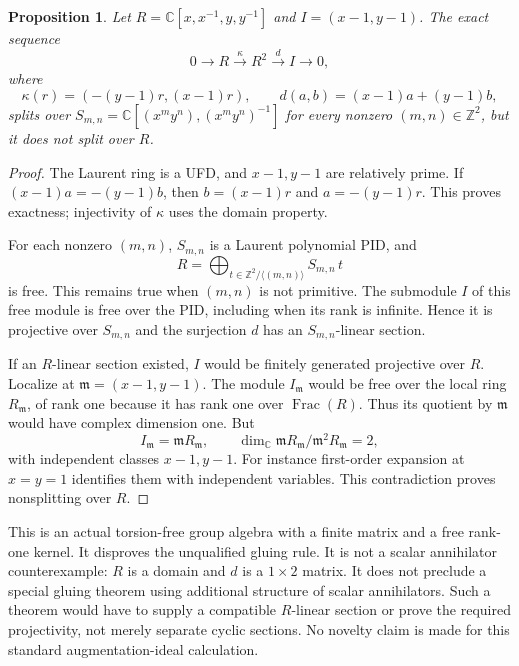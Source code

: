 \documentclass[11pt,a4paper,oneside]{report}
\newtheorem{proposition}[theorem]{Proposition}
\theoremstyle{definition}
\theoremstyle{remark}
\DeclareMathOperator{\Frac}{Frac}
\newcommand{\C}{\mathbb C}
\newcommand{\Z}{\mathbb Z}
\begin{document}
\begin{proposition}\label{M10:prop:gluing}
Let $R=\C[x,x^{-1},y,y^{-1}]$ and $I=(x-1,y-1)$. The exact
sequence
\begin{equation}\label{M10:eq:sequence}
0\longrightarrow R\xrightarrow{\kappa}R^2
\xrightarrow{d}I\longrightarrow0,
\end{equation}
where
\[
\kappa(r)=(-(y-1)r,(x-1)r),\qquad
d(a,b)=(x-1)a+(y-1)b,
\]
splits over $S_{m,n}=\C[(x^my^n),(x^my^n)^{-1}]$ for every
nonzero $(m,n)\in\Z^2$, but it does not split over $R$.
\end{proposition}
\begin{proof}
The Laurent ring is a UFD, and $x-1,y-1$ are relatively prime.
If $(x-1)a=-(y-1)b$, then $b=(x-1)r$ and $a=-(y-1)r$.
This proves exactness; injectivity of $\kappa$ uses the domain
property.

For each nonzero $(m,n)$, $S_{m,n}$ is a Laurent polynomial
PID, and
\[
R=\bigoplus_{t\in\Z^2/\langle(m,n)\rangle}S_{m,n}\,t
\]
is free. This remains true when $(m,n)$ is not primitive.
The submodule $I$ of this free module is free over the PID,
including when its rank is infinite. Hence it is projective
over $S_{m,n}$ and the surjection $d$ has an $S_{m,n}$-linear
section.

If an $R$-linear section existed, $I$ would be finitely generated
projective over $R$. Localize at $\mathfrak m=(x-1,y-1)$.
The module $I_{\mathfrak m}$ would be free over the local ring
$R_{\mathfrak m}$, of rank one because it has rank one over
$\Frac(R)$. Thus its quotient by $\mathfrak m$ would have
complex dimension one. But
\[
I_{\mathfrak m}=\mathfrak mR_{\mathfrak m},\qquad
\dim_\C\mathfrak mR_{\mathfrak m}/\mathfrak m^2R_{\mathfrak m}=2,
\]
with independent classes $x-1,y-1$. For instance first-order
expansion at $x=y=1$ identifies them with independent variables.
This contradiction proves nonsplitting over $R$.
\end{proof}

This is an actual torsion-free group algebra with a finite matrix
and a free rank-one kernel. It disproves the unqualified gluing
rule. It is not a scalar annihilator counterexample: $R$ is a
domain and $d$ is a $1\times2$ matrix. It does not preclude a
special gluing theorem using additional structure of scalar
annihilators. Such a theorem would have to supply a compatible
$R$-linear section or prove the required projectivity, not merely
separate cyclic sections. No novelty claim is made for this
standard augmentation-ideal calculation.
\end{document}
